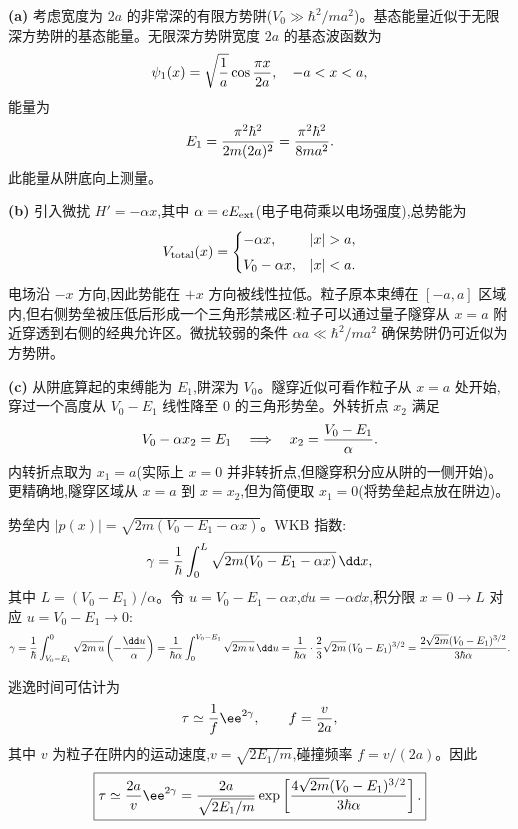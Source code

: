 \begin{solution}
\textbf{(a)} 考虑宽度为 $2a$ 的非常深的有限方势阱($V_0\gg\hbar^2/ma^2$)。基态能量近似于无限深方势阱的基态能量。无限深方势阱宽度 $2a$ 的基态波函数为
\[
\psi_1(x)=\sqrt{1\over a}\cos{\pi x\over 2a},\quad -a<x<a,
\]
能量为
\[
E_1={\pi^2\hbar^2\over 2m(2a)^2}={\pi^2\hbar^2\over 8ma^2}.
\]
此能量从阱底向上测量。

\textbf{(b)} 引入微扰 $H'=-\alpha x$,其中 $\alpha=eE_{\rm ext}$(电子电荷乘以电场强度),总势能为
\[
V_{\rm total}(x)=\begin{cases}
-\alpha x, & |x|>a,\\[4pt]
V_0-\alpha x, & |x|<a.
\end{cases}
\]
电场沿 $-x$ 方向,因此势能在 $+x$ 方向被线性拉低。粒子原本束缚在 $[-a,a]$ 区域内,但右侧势垒被压低后形成一个三角形禁戒区:粒子可以通过量子隧穿从 $x=a$ 附近穿透到右侧的经典允许区。微扰较弱的条件 $\alpha a\ll\hbar^2/ma^2$ 确保势阱仍可近似为方势阱。

\textbf{(c)} 从阱底算起的束缚能为 $E_1$,阱深为 $V_0$。隧穿近似可看作粒子从 $x=a$ 处开始,穿过一个高度从 $V_0-E_1$ 线性降至 $0$ 的三角形势垒。外转折点 $x_2$ 满足
\[
V_0-\alpha x_2 = E_1 \quad\Longrightarrow\quad
x_2 = {V_0-E_1\over\alpha}.
\]
内转折点取为 $x_1=a$(实际上 $x=0$ 并非转折点,但隧穿积分应从阱的一侧开始)。更精确地,隧穿区域从 $x=a$ 到 $x=x_2$,但为简便取 $x_1=0$(将势垒起点放在阱边)。

势垒内 $|p(x)|=\sqrt{2m(V_0-E_1-\alpha x)}$。WKB 指数:
\[
\gamma={1\over\hbar}\int_0^{L}\sqrt{2m(V_0-E_1-\alpha x)}\,\dd x,
\]
其中 $L=(V_0-E_1)/\alpha$。令 $u=V_0-E_1-\alpha x$,$\dd u=-\alpha\dd x$,积分限 $x=0\to L$ 对应 $u=V_0-E_1\to 0$:
\[
\gamma={1\over\hbar}\int_{V_0-E_1}^{0}\sqrt{2m\,u}\left(-{\dd u\over\alpha}\right)
={1\over\hbar\alpha}\int_0^{V_0-E_1}\sqrt{2m\,u}\,\dd u
={1\over\hbar\alpha}\cdot{2\over3}\sqrt{2m}\,(V_0-E_1)^{3/2}
={2\sqrt{2m}(V_0-E_1)^{3/2}\over3\hbar\alpha}.
\]

逃逸时间可估计为
\[
\tau\simeq {1\over f}\ee^{2\gamma},\qquad f={v\over 2a},
\]
其中 $v$ 为粒子在阱内的运动速度,$v=\sqrt{2E_1/m}$,碰撞频率 $f=v/(2a)$。因此
\[
\boxed{\tau\simeq {2a\over v}\ee^{2\gamma}
={2a\over\sqrt{2E_1/m}}\exp\left[{4\sqrt{2m}(V_0-E_1)^{3/2}\over3\hbar\alpha}\right].}
\]


\end{solution}
